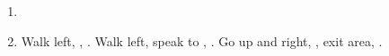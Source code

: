\begin{enumerate}[resume]
	\item \formation{\tidus}{\yuna}{\auron}
	\item Walk left, \save, \sd. Walk left, speak to \auron, \sd. Go up and right, \sd, exit area, \sd.
\end{enumerate}
\bothvfill\winvfill\lossvfill
\ 
\bothcb\wincb\losscb

